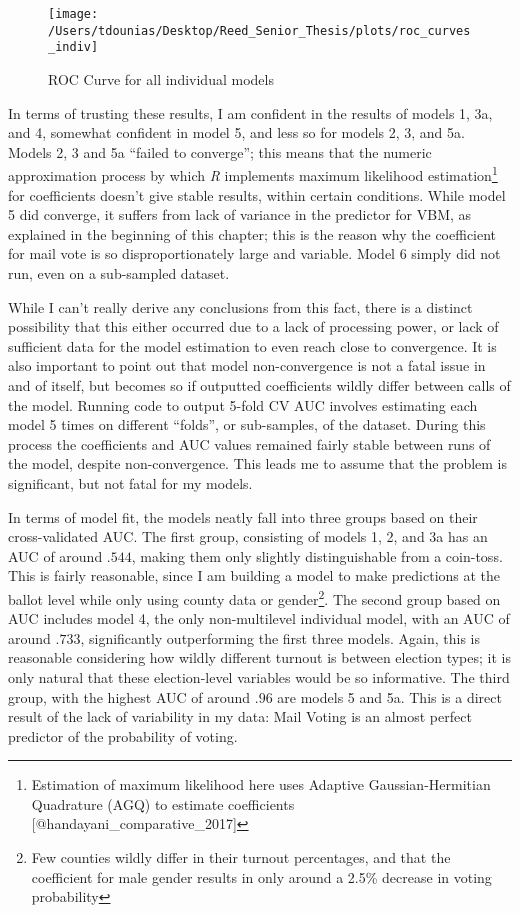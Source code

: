 \documentclass[]{article}
\let\rmarkdownfootnote\footnote%
\def\footnote{\protect\rmarkdownfootnote}
\begin{document}
\begin{figure}

{\centering \texttt{[image: /Users/tdounias/Desktop/Reed\_Senior\_Thesis/plots/roc\_curves\_indiv]} 

}

\caption{ROC Curve for all individual models}\label{fig:roc the curves}
\end{figure}

In terms of trusting these results, I am confident in the results of
models 1, 3a, and 4, somewhat confident in model 5, and less so for
models 2, 3, and 5a. Models 2, 3 and 5a ``failed to converge''; this
means that the numeric approximation process by which \textit{R}
implements maximum likelihood estimation\footnote{Estimation of maximum
  likelihood here uses Adaptive Gaussian-Hermitian Quadrature (AGQ) to
  estimate coefficients {[}@handayani\_comparative\_2017{]}} for
coefficients doesn't give stable results, within certain conditions.
While model 5 did converge, it suffers from lack of variance in the
predictor for VBM, as explained in the beginning of this chapter; this
is the reason why the coefficient for mail vote is so disproportionately
large and variable. Model 6 simply did not run, even on a sub-sampled
dataset.

While I can't really derive any conclusions from this fact, there is a
distinct possibility that this either occurred due to a lack of
processing power, or lack of sufficient data for the model estimation to
even reach close to convergence. It is also important to point out that
model non-convergence is not a fatal issue in and of itself, but becomes
so if outputted coefficients wildly differ between calls of the model.
Running code to output 5-fold CV AUC involves estimating each model 5
times on different ``folds'', or sub-samples, of the dataset. During
this process the coefficients and AUC values remained fairly stable
between runs of the model, despite non-convergence. This leads me to
assume that the problem is significant, but not fatal for my models.

In terms of model fit, the models neatly fall into three groups based on
their cross-validated AUC. The first group, consisting of models 1, 2,
and 3a has an AUC of around \(.544\), making them only slightly
distinguishable from a coin-toss. This is fairly reasonable, since I am
building a model to make predictions at the ballot level while only
using county data or gender\footnote{Few counties wildly differ in their
  turnout percentages, and that the coefficient for male gender results
  in only around a 2.5\% decrease in voting probability}. The second
group based on AUC includes model 4, the only non-multilevel individual
model, with an AUC of around \(.733\), significantly outperforming the
first three models. Again, this is reasonable considering how wildly
different turnout is between election types; it is only natural that
these election-level variables would be so informative. The third group,
with the highest AUC of around \(.96\) are models 5 and 5a. This is a
direct result of the lack of variability in my data: Mail Voting is an
almost perfect predictor of the probability of voting.
\end{document}
